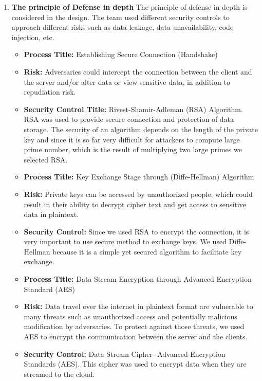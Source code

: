 \documentclass{article}
\begin{document}
\begin{enumerate}
\item \textbf{The principle of Defense in depth}
The principle of defense in depth is considered in the design. The team used different security controls to approach different risks such as data leakage, data unavailability, code injection, etc.
\begin{itemize}
\item \textbf{Process Title:} Establishing Secure Connection (Handshake)
\item \textbf{Risk:} Adversaries could intercept the connection between the client and the server and/or alter data or view sensitive data, in addition to repudiation risk.
\item \textbf{Security Control Title:} Rivest-Shamir-Adleman (RSA) Algorithm. RSA was used to provide secure connection and protection of data storage. The security of an algorithm depends on the length of the private key and since it is so far very difficult for attackers to compute large prime number, which is the result of multiplying two large primes we selected RSA.

\item \textbf{Process Title:} Key Exchange Stage through (Diffe-Hellman) Algorithm
\item \textbf{Risk:} Private keys can be accessed by unauthorized people, which could result in their ability to decrypt cipher text and get access to sensitive data in plaintext.
\item \textbf{Security Control:} Since we used RSA to encrypt the connection, it is very important to use secure method to exchange keys. We used Diffe-Hellman because it is a simple yet secured algorithm to facilitate key exchange.

\item \textbf{Process Title:} Data Stream Encryption through Advanced Encryption Standard (AES)
\item \textbf{Risk:} Data travel over the internet in plaintext format are vulnerable to many threats such as unauthorized access and potentially malicious modification by adversaries. To protect against those threats, we used AES to encrypt the communication between the server and the clients.
\item \textbf{Security Control:} Data Stream Cipher- Advanced Encryption Standards (AES). This cipher was used to encrypt data when they are streamed to the cloud.


\end{itemize}
\end{enumerate}
\end{document}
